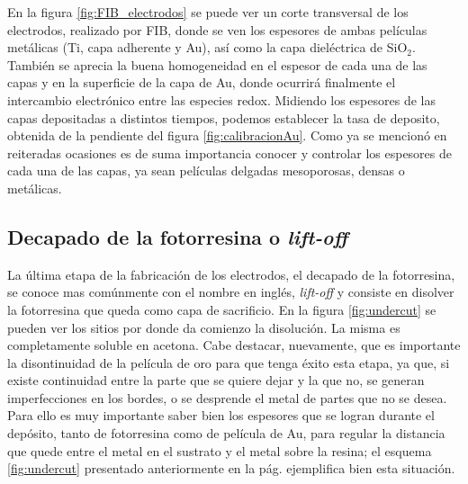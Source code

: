 		 En la figura \ref{fig:FIB_electrodos} se puede ver un corte transversal de los electrodos, realizado por FIB, donde se ven los espesores de ambas películas metálicas (Ti, capa adherente y Au), así como la capa dieléctrica de SiO$_2$. También se aprecia la buena homogeneidad en el espesor de cada una de las capas y en la superficie de la capa de Au, donde ocurrirá finalmente el intercambio electrónico entre las especies redox. Midiendo los espesores de las capas depositadas a distintos tiempos, podemos establecer la tasa de deposito, obtenida de la pendiente del figura \ref{fig:calibracionAu}. Como ya se mencionó en reiteradas ocasiones es de suma importancia conocer y controlar los espesores de cada una de las capas, ya sean películas delgadas mesoporosas, densas o metálicas.
		
  		\subsection{Decapado de la fotorresina o\textit{ lift-off}}


		 La última etapa de la fabricación de los electrodos, el decapado de la fotorresina, se conoce mas comúnmente con el nombre en inglés, \textit{lift-off} y consiste en disolver la fotorresina que queda como capa de sacrificio. En la figura \ref{fig:undercut} se pueden ver los sitios por donde da comienzo la disolución. La misma es completamente soluble en acetona. Cabe destacar, nuevamente, que es importante la disontinuidad de la película de oro para que tenga éxito esta etapa, ya que, si existe continuidad entre la parte que se quiere dejar y la que no, se generan imperfecciones en los bordes, o se desprende el metal de partes que no se desea. Para ello es muy importante saber bien los espesores que se logran durante el depósito, tanto de fotorresina como de película de Au, para regular la distancia que quede entre el metal en el sustrato y el metal sobre la resina; el esquema \ref{fig:undercut} presentado anteriormente en la pág. \pageref{fig:undercut} ejemplifica bien esta situación.

